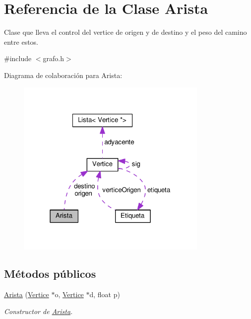 \hypertarget{classArista}{}\section{Referencia de la Clase Arista}
\label{classArista}


Clase que lleva el control del vertice de \textquotesingle{}origen\textquotesingle{} y de \textquotesingle{}destino\textquotesingle{} y el peso del camino entre estos.  




{\ttfamily \#include $<$grafo.\+h$>$}



Diagrama de colaboración para Arista\+:\nopagebreak
\begin{figure}[H]
\begin{center}
\leavevmode
\includegraphics[width=262pt]{classArista__coll__graph}
\end{center}
\end{figure}
\subsection*{Métodos públicos}
\begin{DoxyCompactItemize}
\item 
\hyperlink{classArista_abfc5e334e70240f90b0f8d0cc094ad40}{Arista} (\hyperlink{classVertice}{Vertice} $\ast$o, \hyperlink{classVertice}{Vertice} $\ast$d, float p)
\begin{DoxyCompactList}\small\item\em Constructor de \hyperlink{classArista}{Arista}. \end{DoxyCompactList}\end{DoxyCompactItemize}
